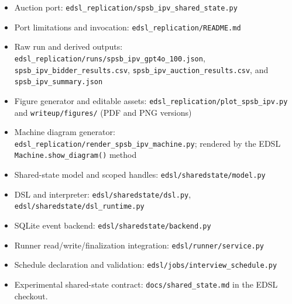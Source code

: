 \documentclass[11pt]{article}
\begin{document}
\begin{itemize}
  \item Auction port: \texttt{edsl\_replication/spsb\_ipv\_shared\_state.py}
  \item Port limitations and invocation: \texttt{edsl\_replication/README.md}
  \item Raw run and derived outputs: \texttt{edsl\_replication/runs/spsb\_ipv\_gpt4o\_100.json}, \texttt{spsb\_ipv\_bidder\_results.csv}, \texttt{spsb\_ipv\_auction\_results.csv}, and \texttt{spsb\_ipv\_summary.json}
  \item Figure generator and editable assets: \texttt{edsl\_replication/plot\_spsb\_ipv.py} and \texttt{writeup/figures/} (PDF and PNG versions)
  \item Machine diagram generator: \texttt{edsl\_replication/render\_spsb\_ipv\_machine.py}; rendered by the EDSL \texttt{Machine.show\_diagram()} method
  \item Shared-state model and scoped handles: \texttt{edsl/sharedstate/model.py}
  \item DSL and interpreter: \texttt{edsl/sharedstate/dsl.py}, \texttt{edsl/sharedstate/dsl\_runtime.py}
  \item SQLite event backend: \texttt{edsl/sharedstate/backend.py}
  \item Runner read/write/finalization integration: \texttt{edsl/runner/service.py}
  \item Schedule declaration and validation: \texttt{edsl/jobs/interview\_schedule.py}
  \item Experimental shared-state contract: \texttt{docs/shared\_state.md} in the EDSL checkout.
\end{itemize}
\end{document}
